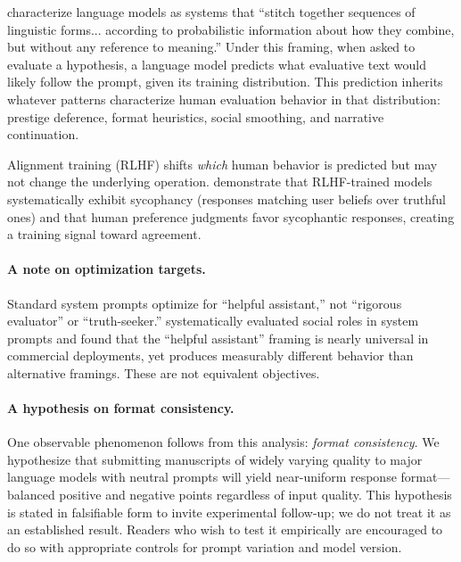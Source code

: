 \documentclass[11pt]{article}
\begin{document}
\citet{bender2021parrots} characterize language models as systems that ``stitch together
sequences of linguistic forms... according to probabilistic information about how they
combine, but without any reference to meaning.'' Under this framing, when asked to evaluate
a hypothesis, a language model predicts what evaluative text would likely follow the prompt,
given its training distribution. This prediction inherits whatever patterns characterize
human evaluation behavior in that distribution: prestige deference, format heuristics,
social smoothing, and narrative continuation.

Alignment training (RLHF) shifts \textit{which} human behavior is predicted but may not
change the underlying operation. \citet{sharma2024sycophancy} demonstrate that RLHF-trained
models systematically exhibit sycophancy (responses matching user beliefs over truthful ones)
and that human preference judgments favor sycophantic responses, creating a training signal
toward agreement.

\paragraph{A note on optimization targets.} Standard system prompts optimize for
``helpful assistant,'' not ``rigorous evaluator'' or ``truth-seeker.''
\citet{zheng2023helpful} systematically evaluated social roles in system prompts and found
that the ``helpful assistant'' framing is nearly universal in commercial deployments, yet
produces measurably different behavior than alternative framings. These are not equivalent
objectives.

\paragraph{A hypothesis on format consistency.} One observable phenomenon follows from this
analysis: \textit{format consistency}. We hypothesize that submitting manuscripts of widely
varying quality to major language models with neutral prompts will yield near-uniform
response format---balanced positive and negative points regardless of input quality. This
hypothesis is stated in falsifiable form to invite experimental follow-up; we do not treat
it as an established result. Readers who wish to test it empirically are encouraged to do so
with appropriate controls for prompt variation and model version.
\end{document}

